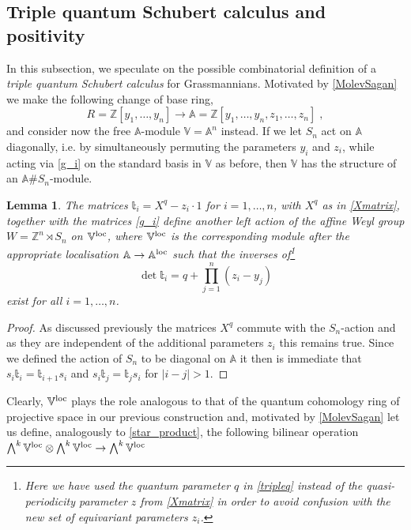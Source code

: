 \documentclass[12pt]{amsart}
\newcommand{\Z}{\mathbb{Z}}
\newcommand{\mb}[1]{\mathbb{#1}}
\newcommand{\ring}{R}
\newcommand{\bt}{\mathbb{t}}
\newtheorem{lemma}[prop]{Lemma}
\numberwithin{equation}{section}
\numberwithin{figure}{section}
\begin{document}
\subsection{Triple quantum Schubert calculus and positivity}\label{sec:tripleSchubert} 

In this subsection, we speculate on the possible combinatorial definition of a {\em triple quantum Schubert calculus} for Grassmannians. 
Motivated by \eqref{MolevSagan} we make the following change of base ring, $$\ring=\Z[y_1,\ldots,y_n]\to\mb{A}=\Z[y_1,\ldots,y_n,z_1,\ldots,z_n]\;,$$ and consider now the free $\mb{A}$-module $\mb{V}=\mb{A}^n$ instead. If we let $S_n$ act on $\mb{A}$ diagonally, i.e. by simultaneously permuting the parameters $y_i$ and $z_i$, while acting via \eqref{g_i} on the standard basis in $\mb{V}$ as before, then $\mb{V}$ has the structure of an $\mb{A}\#S_n$-module. 
\begin{lemma}
    The matrices $\bt_i=X^q-z_i\cdot1$ for $i=1,\ldots,n$, with $X^q$ as in \eqref{Xmatrix}, together with the matrices \eqref{g_i} define another left action of the affine Weyl group $W=\Z^n\rtimes S_n$ on $\mb{V}^{\rm loc}$, where $\mb{V}^{\rm loc}$ is the corresponding module after the appropriate localisation $\mb{A}\to\mb{A}^{\rm loc}$ such that the inverses of\footnote{Here we have used the quantum parameter $q$ in \eqref{tripleq} instead of the quasi-periodicity parameter $z$ from \eqref{Xmatrix} in order to avoid confusion with the new set of equivariant parameters $z_i$.}
    \begin{equation}\label{tripleq}
    \det \bt_i=q+\prod_{j=1}^n(z_i-y_j)
    \end{equation}
    exist for all $i=1,\ldots,n$.
\end{lemma}
\begin{proof}
    As discussed previously the matrices $X^q$ commute with the $S_n$-action and as they are independent of the additional parameters $z_i$ this remains true. Since we defined the action of $S_n$ to be diagonal on $\mb{A}$ it then is immediate that $s_i\bt_i=\bt_{i+1}s_i$ and $s_i\bt_j=\bt_js_i$ for $|i-j|>1$. 
\end{proof}
Clearly, $\mb{V}^{\rm loc}$ plays the role analogous to that of the quantum cohomology ring of projective space in our previous construction and, motivated by \eqref{MolevSagan} let us define, analogously to \eqref{star_product}, the following bilinear operation $\bigwedge^k\mb{V}^{\rm loc}\otimes\bigwedge^k\mb{V}^{\rm loc}\to\bigwedge^k\mb{V}^{\rm loc}$ 
\end{document}
